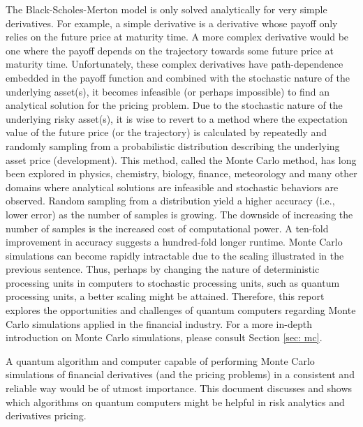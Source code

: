 \documentclass[../main.tex]{subfiles}
\begin{document}
The Black-Scholes-Merton model is only solved analytically for very simple derivatives. For example, a simple derivative is a derivative whose payoff only relies on the future price at maturity time. A more complex derivative would be one where the payoff depends on the trajectory towards some future price at maturity time. Unfortunately, these complex derivatives have path-dependence embedded in the payoff function and combined with the stochastic nature of the underlying asset(s), it becomes infeasible (or perhaps impossible) to find an analytical solution for the pricing problem. Due to the stochastic nature of the underlying risky asset(s), it is wise to revert to a method where the expectation value of the future price (or the trajectory) is calculated by repeatedly and randomly sampling from a probabilistic distribution describing the underlying asset price (development). This method, called the Monte Carlo method, has long been explored in physics, chemistry, biology, finance, meteorology and many other domains where analytical solutions are infeasible and stochastic behaviors are observed. Random sampling from a distribution yield a higher accuracy (i.e., lower error) as the number of samples is growing. The downside of increasing the number of samples is the increased cost of computational power. A ten-fold improvement in accuracy suggests a hundred-fold longer runtime. Monte Carlo simulations can become rapidly intractable due to the scaling illustrated in the previous sentence. Thus, perhaps by changing the nature of deterministic processing units in computers to stochastic processing units, such as quantum processing units, a better scaling might be attained. Therefore, this report explores the opportunities and challenges of quantum computers regarding Monte Carlo simulations applied in the financial industry. For a more in-depth introduction on Monte Carlo simulations, please consult Section \ref{sec: mc}.
\par

A quantum algorithm and computer capable of performing Monte Carlo simulations of financial derivatives (and the pricing problems) in a consistent and reliable way would be of utmost importance. This document discusses and shows which algorithms on quantum computers might be helpful in risk analytics and derivatives pricing.\par

\end{document}
